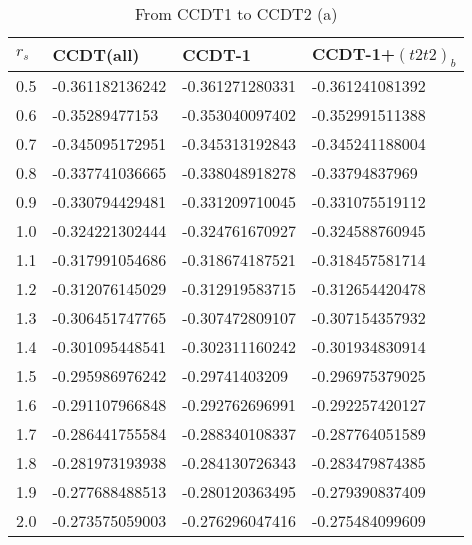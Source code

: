 \begin{table}[h]
\caption{From CCDT1 to CCDT2 (a)}
\begin{center}
\begin{threeparttable}
\begin{tabular}{l l l l}
    \toprule
$r_s$ & CCDT(all) & CCDT-1 & CCDT-1+$(t2t2)_b$  \\ \hline
0.5 & -0.361182136242 & -0.361271280331 & -0.361241081392   \\
0.6 & -0.35289477153 & -0.353040097402 & -0.352991511388   \\
0.7 & -0.345095172951 & -0.345313192843 & -0.345241188004   \\
0.8 & -0.337741036665 & -0.338048918278 & -0.33794837969   \\
0.9 & -0.330794429481 & -0.331209710045 & -0.331075519112   \\
1.0 & -0.324221302444 & -0.324761670927 & -0.324588760945   \\
1.1 & -0.317991054686 & -0.318674187521 & -0.318457581714   \\
1.2 & -0.312076145029 & -0.312919583715 & -0.312654420478   \\
1.3 & -0.306451747765 & -0.307472809107 & -0.307154357932   \\
1.4 & -0.301095448541 & -0.302311160242 & -0.301934830914   \\
1.5 & -0.295986976242 & -0.29741403209 & -0.296975379025   \\
1.6 & -0.291107966848 & -0.292762696991 & -0.292257420127   \\
1.7 & -0.286441755584 & -0.288340108337 & -0.287764051589   \\
1.8 & -0.281973193938 & -0.284130726343 & -0.283479874385   \\
1.9 & -0.277688488513 & -0.280120363495 & -0.279390837409   \\
2.0 & -0.273575059003 & -0.276296047416 & -0.275484099609   \\
\bottomrule
\end{tabular}
\begin{tablenotes}
\end{tablenotes}
\end{threeparttable}
\end{center}
\label{tab:ccdt1_to_ccdt2_1}
\end{table}


